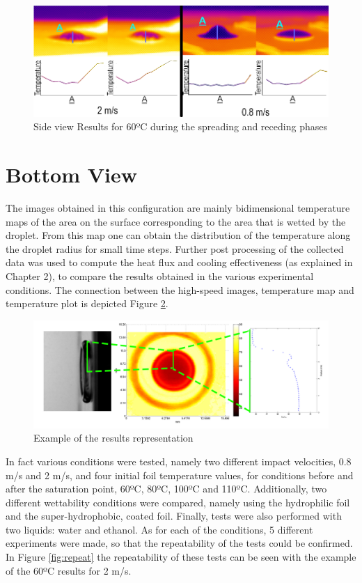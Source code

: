 \begin{figure}[h]
\centering
\includegraphics[width=0.66\linewidth]{Figures/5.Chapter/hexp2.png}
\caption{Side view Results for 60ºC during the spreading and receding phases}
\label{fig:hexp2}
\end{figure}

\section{Bottom View}

\par The images obtained in this configuration are mainly bidimensional temperature maps of the area on the surface corresponding to the area that is wetted by the droplet. From this map one can obtain the distribution of the temperature along the droplet radius for small time steps. Further post processing of the collected data was used to compute the heat flux and cooling effectiveness (as explained in Chapter 2), to compare the results obtained in the various experimental conditions. The connection between the high-speed images, temperature map and temperature plot is depicted Figure \ref{fig:hexp}.\\

\begin{figure}[h]
\includegraphics[width=1\linewidth]{Figures/5.Chapter/example.png}
\caption{Example of the results representation}
\label{fig:hexp}
\end{figure}

\par In fact various conditions were tested, namely two different impact velocities, 0.8 m/s and 2 m/s, and four initial foil temperature values, for conditions before and after the saturation point, 60ºC, 80ºC, 100ºC and 110ºC. Additionally, two different wettability conditions were compared, namely using the hydrophilic foil and the super-hydrophobic, coated foil. Finally, tests were also performed with two liquids: water and ethanol. As for each of the conditions, 5 different experiments were made, so that the repeatability of the tests could be confirmed. In Figure \ref{fig:repeat} the repeatability of these tests can be seen with the example of the 60ºC results for 2 m/s.\\

